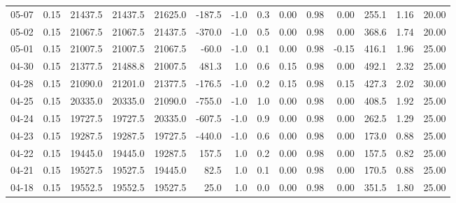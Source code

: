 \begin{threeparttable}
{\begin{tabular}{lrrrrrrrrrrrrr}
  05-07 &     0.15 & 21437.5 & 21437.5 & 21625.0 &     -187.5 &                     -1.0 &                 0.3 &       0.00 &      0.98 &           0.00 &            255.1 &            1.16 &                  20.00 \\
  05-02 &     0.15 & 21067.5 & 21067.5 & 21437.5 &     -370.0 &                     -1.0 &                 0.5 &       0.00 &      0.98 &           0.00 &            368.6 &            1.74 &                  20.00 \\
  05-01 &     0.15 & 21007.5 & 21007.5 & 21067.5 &      -60.0 &                     -1.0 &                 0.1 &       0.00 &      0.98 &          -0.15 &            416.1 &            1.96 &                  25.00 \\
  04-30 &     0.15 & 21377.5 & 21488.8 & 21007.5 &      481.3 &                      1.0 &                 0.6 &       0.15 &      0.98 &           0.00 &            492.1 &            2.32 &                  25.00 \\
  04-28 &     0.15 & 21090.0 & 21201.0 & 21377.5 &     -176.5 &                     -1.0 &                 0.2 &       0.15 &      0.98 &           0.15 &            427.3 &            2.02 &                  30.00 \\
  04-25 &     0.15 & 20335.0 & 20335.0 & 21090.0 &     -755.0 &                     -1.0 &                 1.0 &       0.00 &      0.98 &           0.00 &            408.5 &            1.92 &                  25.00 \\
  04-24 &     0.15 & 19727.5 & 19727.5 & 20335.0 &     -607.5 &                     -1.0 &                 0.9 &       0.00 &      0.98 &           0.00 &            262.5 &            1.29 &                  25.00 \\
  04-23 &     0.15 & 19287.5 & 19287.5 & 19727.5 &     -440.0 &                     -1.0 &                 0.6 &       0.00 &      0.98 &           0.00 &            173.0 &            0.88 &                  25.00 \\
  04-22 &     0.15 & 19445.0 & 19445.0 & 19287.5 &      157.5 &                      1.0 &                 0.2 &       0.00 &      0.98 &           0.00 &            157.5 &            0.82 &                  25.00 \\
  04-21 &     0.15 & 19527.5 & 19527.5 & 19445.0 &       82.5 &                      1.0 &                 0.1 &       0.00 &      0.98 &           0.00 &            170.5 &            0.88 &                  25.00 \\
  04-18 &     0.15 & 19552.5 & 19552.5 & 19527.5 &       25.0 &                      1.0 &                 0.0 &       0.00 &      0.98 &           0.00 &            351.5 &            1.80 &                  25.00 \\

\end{tabular}}
\end{threeparttable}
